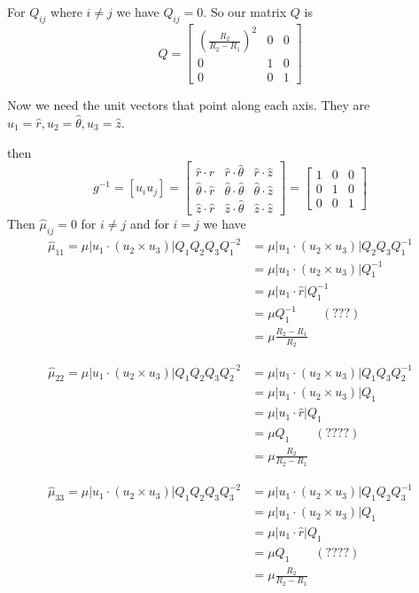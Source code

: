 \documentclass{amsart}
\begin{document}
For $Q_{ij}$ where $i\neq j$ we have $Q_{ij}=0$. So our matrix $Q$ is
\[
  Q=\begin{bmatrix}
    \left(\frac{R_2}{R_2-R_1}\right)^2 & 0 & 0\\
    0 & 1 & 0\\
    0 & 0 & 1
  \end{bmatrix}
\]

Now we need the unit vectors that point along each axis. They are $u_1=\hat{r},u_2=\hat{\theta},u_3=\hat{z}$.

then
\[
  g^{-1}=
  [u_iu_j]=
  \begin{bmatrix}
    \hat{r}\cdot\hat{r} & \hat{r}\cdot\hat{\theta} & \hat{r}\cdot\hat{z}\\
    \hat{\theta}\cdot\hat{r} & \hat{\theta}\cdot\hat{\theta} & \hat{\theta}\cdot\hat{z}\\
    \hat{z}\cdot\hat{r} & \hat{z}\cdot\hat{\theta} & \hat{z}\cdot\hat{z}
  \end{bmatrix}
  =
  \begin{bmatrix}
    1 & 0 & 0\\
    0 & 1 & 0\\
    0 & 0 & 1
  \end{bmatrix}
\]
Then $\hat{\mu}_{ij}=0$ for $i\neq j$ and for $i=j$ we have
\begin{align*}
  \hat{\mu}_{11}=\mu|u_1\cdot(u_2\times u_3)|Q_1Q_2Q_3Q_1^{-2}
  &=\mu|u_1\cdot(u_2\times u_3)|Q_2Q_3Q_1^{-1}\\
  &=\mu|u_1\cdot(u_2\times u_3)|Q_1^{-1}\\
  &=\mu|u_1\cdot\hat{r}|Q_1^{-1}\\
  &=\mu Q_1^{-1}\qquad (???)\\
  &=\mu \frac{R_2-R_1}{R_2}
\end{align*}

\begin{align*}
  \hat{\mu}_{22}=\mu|u_1\cdot(u_2\times u_3)|Q_1Q_2Q_3Q_2^{-2}
  &=\mu|u_1\cdot(u_2\times u_3)|Q_1Q_3Q_2^{-1}\\
  &=\mu|u_1\cdot(u_2\times u_3)|Q_1\\
  &=\mu|u_1\cdot\hat{r}|Q_1\\
  &=\mu Q_1\qquad (????)\\
  &=\mu \frac{R_2}{R_2-R_1}
\end{align*}

\begin{align*}
  \hat{\mu}_{33}=\mu|u_1\cdot(u_2\times u_3)|Q_1Q_2Q_3Q_3^{-2}
  &=\mu|u_1\cdot(u_2\times u_3)|Q_1Q_2Q_3^{-1}\\
  &=\mu|u_1\cdot(u_2\times u_3)|Q_1\\
  &=\mu|u_1\cdot\hat{r}|Q_1\\
  &=\mu Q_1\qquad (????)\\
  &=\mu \frac{R_2}{R_2-R_1}
\end{align*}

\end{document}
